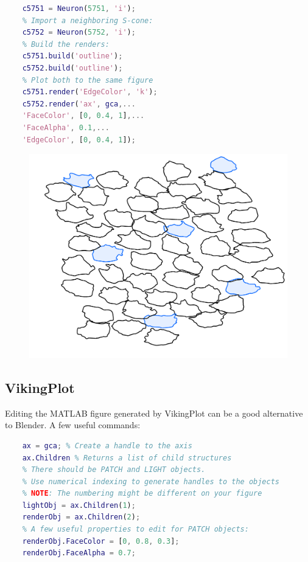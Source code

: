 \documentclass[12pt]{exam}
\begin{document}
	\begin{lstlisting}[language=matlab]
	% Import an L/M-cone:
	c5751 = Neuron(5751, 'i');
	% Import a neighboring S-cone:
	c5752 = Neuron(5752, 'i');
	% Build the renders:
	c5751.build('outline');
	c5752.build('outline');
	% Plot both to the same figure
	c5751.render('EdgeColor', 'k');
	c5752.render('ax', gca,...
	'FaceColor', [0, 0.4, 1],...
	'FaceAlpha', 0.1,...
	'EdgeColor', [0, 0.4, 1]);\end{lstlisting}	
	\begin{figure}
		\includegraphics[width=\linewidth]{cone_mosaic}
		\label{mosaicfig}
	\end{figure}
	\subsection{VikingPlot}
	Editing the MATLAB figure generated by VikingPlot can be a good alternative to Blender. A few useful commands:
	\begin{lstlisting}[language=matlab]
	% Make sure the figure is the active window.
	ax = gca; % Create a handle to the axis
	ax.Children % Returns a list of child structures
	% There should be PATCH and LIGHT objects.
	% Use numerical indexing to generate handles to the objects
	% NOTE: The numbering might be different on your figure
	lightObj = ax.Children(1);
	renderObj = ax.Children(2);
	% A few useful properties to edit for PATCH objects:
	renderObj.FaceColor = [0, 0.8, 0.3];
	renderObj.FaceAlpha = 0.7;\end{lstlisting}
\end{document}
